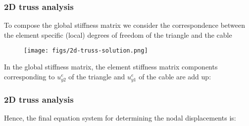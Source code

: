 \documentclass[notes]{beamer}
\begin{document}
\begin{frame}
\frametitle{2D truss analysis}
To compose the global stiffness matrix we consider the correspondence between the
element specific (local) degrees of freedom of the triangle and the cable

\begin{figure}
	\centering
	\texttt{[image: figs/2d-truss-solution.png]}
\end{figure}

In the global stiffness matrix, the element stiffness matrix components corresponding
to $u^e_{y2}$ of the triangle and $u^e_{y1}$ of the cable are add up:

\end{frame}

\begin{frame}
\frametitle{2D truss analysis}
Hence, the final equation system for determining the nodal displacements is:
\end{frame}
\end{document}
